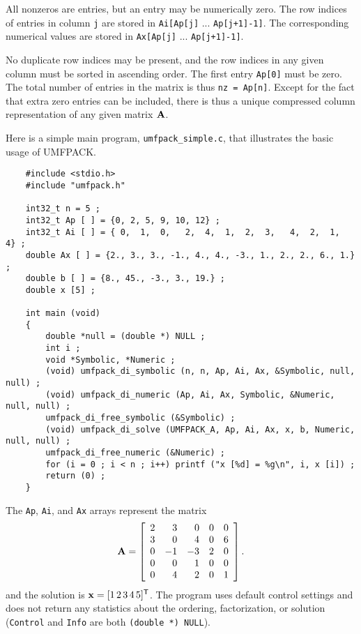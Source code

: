 \documentclass[11pt]{article}
\newcommand{\m}[1]{{\bf{#1}}}       %
\newcommand{\tr}{^{\sf T}}          %
\begin{document}
All nonzeros are entries, but an entry may be numerically zero.  The row indices
of entries in column {\tt j} are stored in
    {\tt Ai[Ap[j]} ... {\tt Ap[j+1]-1]}.
The corresponding numerical values are stored in
    {\tt Ax[Ap[j]} ... {\tt Ap[j+1]-1]}.

No duplicate row indices may be present, and the row indices in any given
column must be sorted in ascending order.  The first entry {\tt Ap[0]} must be
zero.  The total number of entries in the matrix is thus {\tt nz = Ap[n]}.
Except for the fact that extra zero entries can be included, there is thus a
unique compressed column representation of any given matrix $\m{A}$.

Here is a simple main program, {\tt umfpack\_simple.c}, that illustrates the
basic usage of UMFPACK.

{\footnotesize
\begin{verbatim}
    #include <stdio.h>
    #include "umfpack.h"

    int32_t n = 5 ;
    int32_t Ap [ ] = {0, 2, 5, 9, 10, 12} ;
    int32_t Ai [ ] = { 0,  1,  0,   2,  4,  1,  2,  3,   4,  2,  1,  4} ;
    double Ax [ ] = {2., 3., 3., -1., 4., 4., -3., 1., 2., 2., 6., 1.} ;
    double b [ ] = {8., 45., -3., 3., 19.} ;
    double x [5] ;

    int main (void)
    {
        double *null = (double *) NULL ;
        int i ;
        void *Symbolic, *Numeric ;
        (void) umfpack_di_symbolic (n, n, Ap, Ai, Ax, &Symbolic, null, null) ;
        (void) umfpack_di_numeric (Ap, Ai, Ax, Symbolic, &Numeric, null, null) ;
        umfpack_di_free_symbolic (&Symbolic) ;
        (void) umfpack_di_solve (UMFPACK_A, Ap, Ai, Ax, x, b, Numeric, null, null) ;
        umfpack_di_free_numeric (&Numeric) ;
        for (i = 0 ; i < n ; i++) printf ("x [%d] = %g\n", i, x [i]) ;
        return (0) ;
    }
\end{verbatim}
}

The {\tt Ap}, {\tt Ai}, and {\tt Ax} arrays represent the matrix
\[
\m{A} = \left[
\begin{array}{rrrrr}
 2 &  3 &  0 &  0 &  0 \\
 3 &  0 &  4 &  0 &  6 \\
 0 & -1 & -3 &  2 &  0 \\
 0 &  0 &  1 &  0 &  0 \\
 0 &  4 &  2 &  0 &  1 \\
\end{array}
\right].
\]
and the solution is $\m{x} = [1 \, 2 \, 3 \, 4 \, 5]\tr$.  The program uses
default control settings and does not return any statistics about the ordering,
factorization, or solution ({\tt Control} and {\tt Info} are both
{\tt (double *) NULL}).
\end{document}
